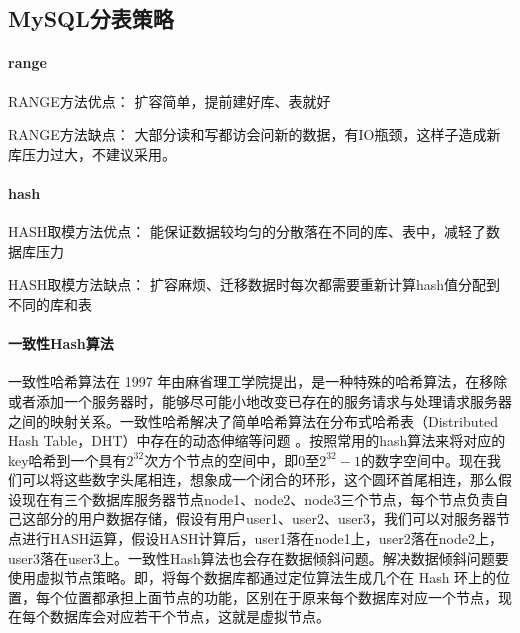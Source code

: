 \documentclass[../../../interview-questions.tex]{subfiles}
\begin{document}
\subsection{MySQL分表策略}

\paragraph{range}

RANGE方法优点： 扩容简单，提前建好库、表就好

RANGE方法缺点： 大部分读和写都访会问新的数据，有IO瓶颈，这样子造成新库压力过大，不建议采用。

\paragraph{hash}

HASH取模方法优点： 能保证数据较均匀的分散落在不同的库、表中，减轻了数据库压力

HASH取模方法缺点： 扩容麻烦、迁移数据时每次都需要重新计算hash值分配到不同的库和表

\paragraph{一致性Hash算法}

一致性哈希算法在 1997 年由麻省理工学院提出，是一种特殊的哈希算法，在移除或者添加一个服务器时，能够尽可能小地改变已存在的服务请求与处理请求服务器之间的映射关系。一致性哈希解决了简单哈希算法在分布式哈希表（Distributed Hash Table，DHT）中存在的动态伸缩等问题 。按照常用的hash算法来将对应的key哈希到一个具有$2^{32}$次方个节点的空间中，即0至$ 2^{32}-1$的数字空间中。现在我们可以将这些数字头尾相连，想象成一个闭合的环形，这个圆环首尾相连，那么假设现在有三个数据库服务器节点node1、node2、node3三个节点，每个节点负责自己这部分的用户数据存储，假设有用户user1、user2、user3，我们可以对服务器节点进行HASH运算，假设HASH计算后，user1落在node1上，user2落在node2上，user3落在user3上。一致性Hash算法也会存在数据倾斜问题。解决数据倾斜问题要使用虚拟节点策略。即，将每个数据库都通过定位算法生成几个在 Hash 环上的位置，每个位置都承担上面节点的功能，区别在于原来每个数据库对应一个节点，现在每个数据库会对应若干个节点，这就是虚拟节点。
\end{document}
